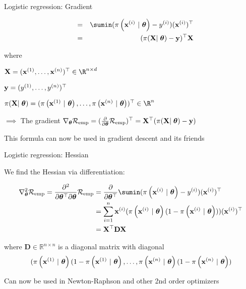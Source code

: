 \documentclass[11pt,compress,t,notes=noshow, xcolor=table]{beamer}
\begin{document}
\begin{frame}{Logistic regression: Gradient}

\begin{align*}
\quad &=& 
\sumin (\pixit - \yi)(\xi)^\top\\
\quad &=& 
(\pi(\mathbf{X}\vert\;\thetav) - \mathbf{y})^\top\mathbf{X}\\
\end{align*}

where

\begin{itemizeM}
\item $\mathbf{X} = (
\xi[1], \dots, 
\xi[n])^\top \in \R^{n\times d}$
\item $\mathbf{y} = (
\yi[1], \dots,\yi[n])^\top$
\item $\pi(\mathbf{X}\vert\;\thetav) = (
\pixit[1], \dots,
\pixit[n]
)^\top \in \R^{n}$
\end{itemizeM}

\vfill

$\implies$ The gradient $\nabla_{\thetav}\riske = (\frac{\partial}{\partial\thetav}\riske)^\top =  \mathbf{X}^\top(\pi(\mathbf{X}\vert\;\thetav) - \mathbf{y})$ 

\vfill

This formula can now be used in gradient descent and its friends

\end{frame}


\begin{frame}{Logistic regression: Hessian}

We find the Hessian via differentiation:

{\small
\begin{align*}
\nabla^2_{\thetav}\riske  = \frac{\partial^2}{\partial{\thetav^\top}\partial\thetav}\riske  & =  
\frac{\partial}{\partial{\thetav^\top}} \sumin (\pixit - \yi)(\xi)^\top\\
& =  
\sum^n_{i=1}\xi (\pixit(1-\pixit))(\xi)^\top\\
& =  
\mathbf{X}^\top \mathbf{D} \mathbf{X}\\
\end{align*}

where $\mathbf{D} \in \mathbb{R}^{n\times n}$ is a diagonal matrix with diagonal 
$$(\pixit[1](1-\pixit[1], \dots, \pixit[n](1-\pixit[n])$$
}

Can now be used in Newton-Raphson and other 2nd order optimizers


\end{frame}
\end{document}
